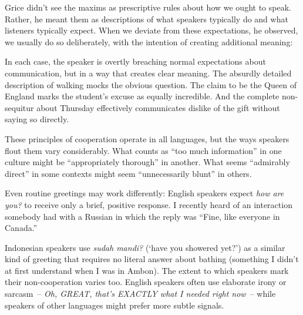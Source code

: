 Grice didn't see the maxims as prescriptive rules about how we ought to speak. Rather, he meant them as descriptions of what speakers typically do and what listeners typically expect. When we deviate from these expectations, he observed, we usually do so deliberately, with the intention of creating additional meaning:

\ea
   \z
\z

In each case, the speaker is overtly breaching normal expectations about communication, but in a way that creates clear meaning. The absurdly detailed description of walking mocks the obvious question. The claim to be the Queen of England marks the student's excuse as equally incredible. And the complete non-sequitur about Thursday effectively communicates dislike of the gift without saying so directly.

These principles of cooperation operate in all languages, but the ways speakers flout them vary considerably. What counts as ``too much information'' in one culture might be ``appropriately thorough'' in another. What seems ``admirably direct'' in some contexts might seem ``unnecessarily blunt'' in others. 

Even routine greetings may work differently: English speakers expect \textit{how are you?} to receive only a brief, positive response. I recently heard of an interaction somebody had with a Russian in which the reply was ``Fine, like everyone in Canada.''

Indonesian speakers use \textit{sudah mandi?} (`have you showered yet?') as a similar kind of greeting that requires no literal answer about bathing (something I didn't at first understand when I was in Ambon). The extent to which speakers mark their non-cooperation varies too. English speakers often use elaborate irony or sarcasm~-- \textit{Oh, GREAT, that's EXACTLY what I needed right now}~-- while speakers of other languages might prefer more subtle signals.

